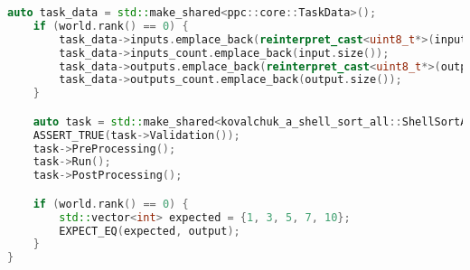 \documentclass[12pt]{article}
\begin{document}
\begin{appendices}
\begin{lstlisting}[language=C++, caption=Фрагмент кода из func_all.cpp]
    auto task_data = std::make_shared<ppc::core::TaskData>();
    if (world.rank() == 0) {
        task_data->inputs.emplace_back(reinterpret_cast<uint8_t*>(input.data()));
        task_data->inputs_count.emplace_back(input.size());
        task_data->outputs.emplace_back(reinterpret_cast<uint8_t*>(output.data()));
        task_data->outputs_count.emplace_back(output.size());
    }

    auto task = std::make_shared<kovalchuk_a_shell_sort_all::ShellSortAll>(task_data);
    ASSERT_TRUE(task->Validation());
    task->PreProcessing();
    task->Run();
    task->PostProcessing();

    if (world.rank() == 0) {
        std::vector<int> expected = {1, 3, 5, 7, 10};
        EXPECT_EQ(expected, output);
    }
}
\end{lstlisting}
\end{appendices}
\end{document}

